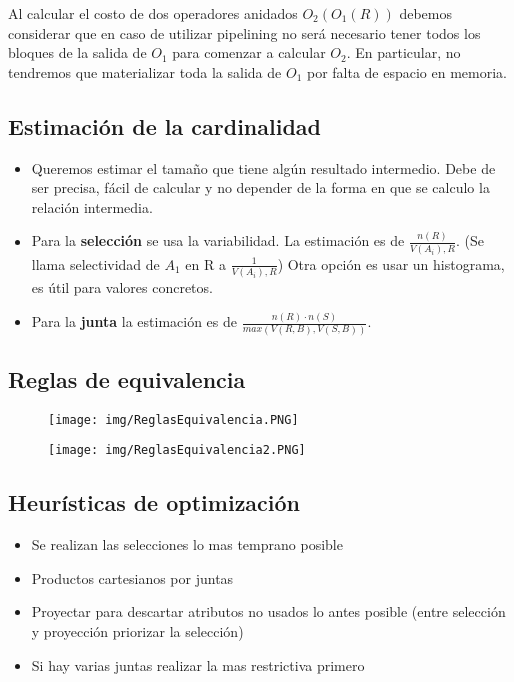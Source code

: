 Al calcular el costo de dos operadores anidados $O_2(O_1(R))$
debemos considerar que en caso de utilizar pipelining no será
necesario tener todos los bloques de la salida de $O_1$ para
comenzar a calcular $O_2$. En particular, no tendremos que
materializar toda la salida de $O_1$ por falta de espacio en memoria.



\subsection*{Estimación de la cardinalidad}
\begin{itemize}
\item Queremos estimar el tamaño que tiene algún resultado intermedio. Debe de ser precisa, fácil de calcular y no depender de la forma en que se calculo la relación intermedia.
\item Para la \textbf{selección} se usa la variabilidad. La estimación es de $\frac{n(R)}{V(A_i),R}$. (Se llama selectividad de $A_1$ en R a $\frac{1}{V(A_i),R}$) Otra opción es usar un histograma, es útil para valores concretos.
\item Para la \textbf{junta} la estimación es de $\frac{n(R) \cdot n(S)}{max(V(R,B), V(S,B))}$.
\end{itemize}

\newpage
\subsection*{Reglas de equivalencia}

\begin{figure}[!htb]
    \centering
    \texttt{[image: img/ReglasEquivalencia.PNG]}
\end{figure}

\begin{figure}[!htb]
    \centering
    \texttt{[image: img/ReglasEquivalencia2.PNG]}
\end{figure}


\subsection*{Heurísticas de optimización}
\begin{itemize}
    \item Se realizan las selecciones lo mas temprano posible
    \item Productos cartesianos por juntas
    \item Proyectar para descartar atributos no usados lo antes posible (entre selección y proyección priorizar la selección)
    \item Si hay varias juntas realizar la mas restrictiva primero
\end{itemize}

\newpage